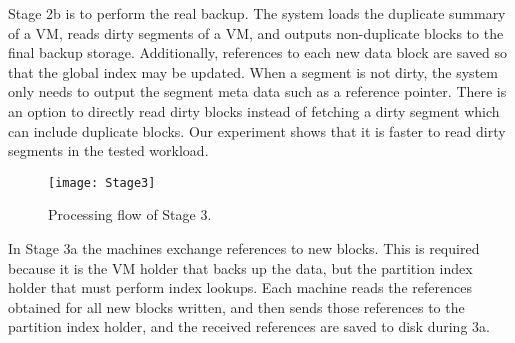 
Stage 2b is to perform the real backup.
The system loads the duplicate summary of a VM, 
reads  dirty segments of a VM, and outputs non-duplicate blocks to the final backup 
storage. Additionally, references to each new data block are saved so that the
global index may be updated.%
When a segment is not dirty, the system only needs to output the segment meta data such as a reference pointer. 
There is an option to directly read dirty blocks instead of fetching a dirty segment which can include duplicate
blocks. Our experiment shows that it is faster to read dirty segments in the tested workload.



\begin{figure}[th]
\centering
\texttt{[image: Stage3]}
\caption{Processing flow of Stage 3.}
\label{fig:stage3}
\end{figure}

In Stage 3a the machines exchange references to new blocks. This is required
because it is the VM holder that backs up the data, but the partition index
holder that must perform index lookups. Each machine reads the references
obtained for all new blocks written, and then sends those references to the
partition index holder, and the received references are saved to disk during 3a.


